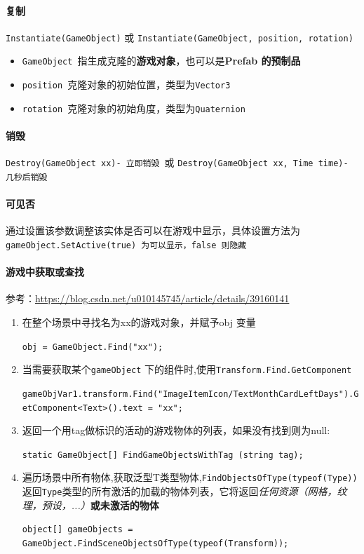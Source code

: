 \documentclass[UTF8,a4paper,12pt]{ctexbook}
\begin{document}
		\paragraph{复制}
			\verb|Instantiate(GameObject)| 或 \verb|Instantiate(GameObject, position, rotation)|
			
			\begin{itemize}
				\item \verb|GameObject |指生成克隆的\textbf{游戏对象}，也可以是\textbf{Prefab 的预制品}
				\item \verb|position |克隆对象的初始位置，类型为\verb|Vector3|
				\item \verb|rotation |克隆对象的初始角度，类型为\verb|Quaternion|
			\end{itemize} 
		
		\paragraph{销毁}
			\verb|Destroy(GameObject xx)- 立即销毁 |或 \verb|Destroy(GameObject xx, Time time)- 几秒后销毁|
			
		\paragraph{可见否}
			通过设置该参数调整该实体是否可以在游戏中显示，具体设置方法为\verb|gameObject.SetActive(true) 为可以显示，false 则隐藏|
		
		\paragraph{游戏中获取或查找}
			参考：\url{https://blog.csdn.net/u010145745/article/details/39160141}
			
			\begin{enumerate}
				\item 在整个场景中寻找名为xx的游戏对象，并赋予obj 变量
					
					\verb|obj = GameObject.Find("xx");|
					
				\item 当需要获取某个\verb|gameObject| 下的组件时,使用\verb|Transform.Find.GetComponent|
					
					\verb|gameObjVar1.transform.Find("ImageItemIcon/TextMonthCardLeftDays").GetComponent<Text>().text = "xx";|
				
				\item 返回一个用tag做标识的活动的游戏物体的列表，如果没有找到则为null: 
				
					\verb|static GameObject[] FindGameObjectsWithTag (string tag);|
				
				\item 遍历场景中所有物体,获取泛型T类型物体,\verb|FindObjectsOfType(typeof(Type))|返回\verb|Type|类型的所有激活的加载的物体列表，它将返回\textit{任何资源（网格，纹理，预设，...）}\textbf{或未激活的物体}
				
					\verb|object[] gameObjects = GameObject.FindSceneObjectsOfType(typeof(Transform));|
			\end{enumerate}
\end{document}

